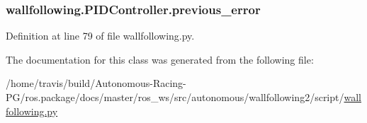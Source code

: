 \subsubsection[{\texorpdfstring{previous\+\_\+error}{previous_error}}]{\setlength{\rightskip}{0pt plus 5cm}wallfollowing.\+P\+I\+D\+Controller.\+previous\+\_\+error}\hypertarget{classwallfollowing_1_1_p_i_d_controller_a8f880f52e6d6f020769ab01d6459c908}{}\label{classwallfollowing_1_1_p_i_d_controller_a8f880f52e6d6f020769ab01d6459c908}


Definition at line 79 of file wallfollowing.\+py.



The documentation for this class was generated from the following file\+:\begin{DoxyCompactItemize}
\item 
/home/travis/build/\+Autonomous-\/\+Racing-\/\+P\+G/ros.\+package/docs/master/ros\+\_\+ws/src/autonomous/wallfollowing2/script/\hyperlink{wallfollowing_8py}{wallfollowing.\+py}\end{DoxyCompactItemize}
